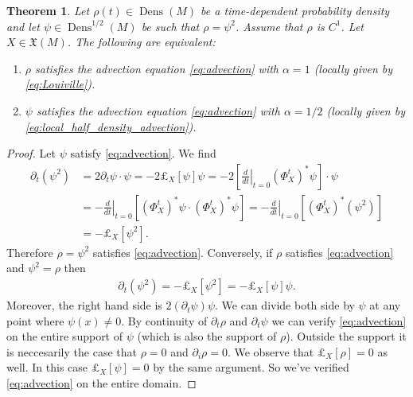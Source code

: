 \documentclass[a4paper, 12 pt]{amsart}
\newtheorem{thm}{Theorem}[section]
\DeclareMathOperator{\Dens}{Dens}
\begin{document}
  \begin{thm} \label{thm:advection}
    Let $\rho(t) \in \Dens(M)$ be a time-dependent probability density
    and let $\psi \in \Dens^{1/2}(M)$ be such that $\rho = \psi^2$.
    Assume that $\rho$ is $C^1$.
    Let $X \in \mathfrak{X}(M)$.
    The following are equivalent:
    \begin{enumerate}
      \item $\rho$ satisfies the advection equation \eqref{eq:advection} with $\alpha = 1$ (locally given by \eqref{eq:Louiville}).
      \item $\psi$ satisfies the advection equation \eqref{eq:advection} with $\alpha = 1/2$ (locally given by \eqref{eq:local_half_density_advection}).
    \end{enumerate}
  \end{thm}
  \begin{proof}
    Let $\psi$ satisfy \eqref{eq:advection}.
    We find
    \begin{align*}
      \partial_t (\psi^2) &= 2 \partial_t\psi \cdot \psi
      =-2 \pounds_X[\psi] \psi 
      = - 2 \left[ \left.\frac{d}{dt}\right|_{t=0}
         (\Phi_X^t)^* \psi \right] \cdot \psi \\
      &= - \left. \frac{d}{dt} \right|_{t=0}
        \left[ (\Phi_X^t)^* \psi \cdot (\Phi_X^t)^* \psi \right]
      = - \left. \frac{d}{dt} \right|_{t=0}
        \left[ (\Phi_X^t)^* (\psi^2) \right] \\
      &= - \pounds_X[\psi^2].
    \end{align*}
    Therefore $\rho = \psi^2$ satisfies \eqref{eq:advection}.
    Conversely, if $\rho$ satisfies \eqref{eq:advection}
    and $\psi^2 = \rho$ then
    \begin{align*}
      \partial_t (\psi^2) = - \pounds_X[\psi^2] = - \pounds_X[\psi] \psi.
    \end{align*}
    Moreover, the right hand side is $2 (\partial_t \psi) \psi$.
    We can divide both side by $\psi$ at any point where $\psi(x) \neq 0$.
    By continuity of $\partial_t \rho$ and $\partial_t \psi$ we can
    verify \eqref{eq:advection} on the entire support of $\psi$
    (which is also the support of $\rho$).
    Outside the support it is neccesarily the case that
    $\rho = 0$ and  $\partial_i \rho = 0$.
    We observe that $\pounds_X[\rho] = 0$ as well.
    In this case $\pounds_X[\psi] = 0$ by the same argument.
    So we've verified \eqref{eq:advection} on the entire domain.
  \end{proof}
\end{document}
